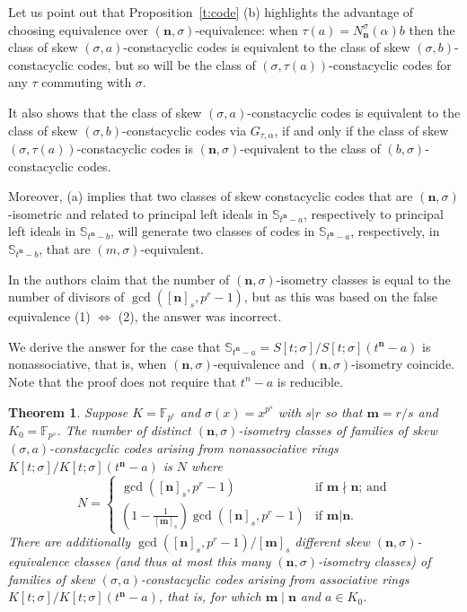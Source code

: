 \documentclass[11pt]{amsart}
\theoremstyle{plain}
\newtheorem{theorem}{Theorem}[section]
\theoremstyle{definition}
\numberwithin{equation}{section}
\numberwithin{figure}{section}
\newcommand{\Sone}[1]{\Stsigma/\Stsigma (t^{\de}-#1)} %
\newcommand{\field}{K}
\newcommand{\Stsigma}{S[t;\sigma]}
\newcommand{\Kone}[1]{K[t;\sigma]/K[t;\sigma](t^{\de}-#1)}
\newcommand{\os}{\mathbf{m}}  %
\newcommand{\de}{\mathbf{n}}  %
\begin{document}
Let us point out that Proposition~\ref{t:code} (b) highlights the advantage of choosing equivalence  over $(\de,\sigma)$-equivalence: when $\tau(a)= N_{\de}^\sigma(\alpha)b$ then the class of skew $(\sigma,a)$-constacyclic codes is equivalent to the class of skew $(\sigma,b)$-constacyclic codes,
but so will be the class of
$(\sigma,\tau(a))$-constacyclic codes for any $\tau$ commuting with $\sigma$.

It also shows that  the class of skew $(\sigma,a)$-constacyclic codes is equivalent to the class of skew $(\sigma,b)$-constacyclic codes via $G_{\tau,\alpha}$, if and only if  the class of skew $(\sigma,\tau(a))$-constacyclic codes is
$(\de,\sigma)$-equivalent to the class of $(b,\sigma)$-constacyclic codes.

Moreover,
(a) implies  that two classes of skew constacyclic codes  that are $(\de,\sigma)$-isometric and related to principal left ideals in $\mathbb{S}_{t^\de-a}$,  %
respectively to principal left ideals in $\mathbb{S}_{t^\de-b}$, 
will generate two classes of codes in $\mathbb{S}_{t^\de-a}$,
respectively, in $\mathbb{S}_{t^\de-b}$, 
that are $(m,\sigma)$-equivalent.


In \cite[Theorem 4]{OuazzouNajmeddineAydin2025} the authors claim that the number of $(\de,\sigma)$-isometry classes is equal to the number of divisors of $\gcd([\de]_s,p^r-1)$, but as this was based on the false equivalence (1) $\iff$ (2), the answer was incorrect.

We derive the answer for the case that $\mathbb{S}_{t^\de-a}=\Sone{a}$ is nonassociative, that is, when $(\de,\sigma)$-equivalence and $(\de,\sigma)$-isometry coincide.  Note that the proof does not require that $t^n-a$ is reducible.


\begin{theorem}\label{c:Ouazzoufinite}
    Suppose $K=\mathbb{F}_{p^r}$ and $\sigma(x)=x^{p^s}$ with $s|r$ so that $\os=r/s$ and $\field_0=\mathbb{F}_{p^s}$.
    The number of distinct $(\de,\sigma)$-isometry classes of families of skew $(\sigma,a)$-constacyclic codes arising from nonassociative rings $\Kone{a}$ is $N$ where
    $$
     N= \begin{cases}
     \gcd([\de]_{s},p^r-1)&\text{if $\os\nmid \de$; and}\\
    \left(1-\frac{1}{[\os]_s}\right)\gcd([\de]_{s},p^r-1) & \text{if  $\os|\de$.}
    \end{cases}
    $$
    There are additionally $\gcd([\de]_{s},p^r-1)/[\os]_s$ different skew $(\de,\sigma)$-equivalence classes (and thus at most this many $(\de,\sigma)$-isometry classes) of families of skew $(\sigma,a)$-constacyclic codes arising from associative rings $\Kone{a}$, that is, for which $\os\mid \de$ and $a\in \field_0$.
    \end{theorem}
\end{document}
